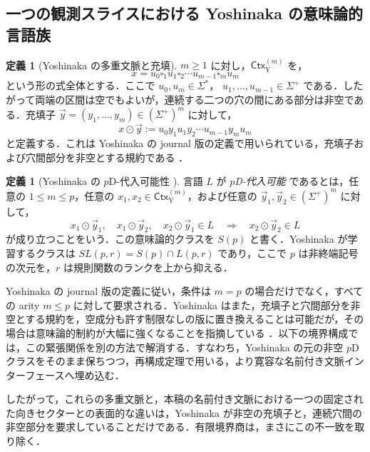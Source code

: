 \documentclass[11pt,a4paper]{ltjsarticle}
\numberwithin{equation}{section}
\theoremstyle{plain}
\theoremstyle{definition}
\newtheorem{definition}[theorem]{定義}
\theoremstyle{remark}
\newcommand{\tuple}[1]{\vec{#1}}
\newcommand{\blank}{\square}
\begin{document}
\subsection{一つの観測スライスにおける Yoshinaka の意味論的言語族}

\begin{definition}[Yoshinaka の多重文脈と充填]
\label{def:yoshinaka-multicontexts}
$m\ge1$ に対し，$\mathsf{Ctx}_{\mathrm Y}^{(m)}$ を，
\[
  x=u_0\blank_1u_1\blank_2\cdots
    u_{m-1}\blank_m u_m
\]
という形の式全体とする．ここで $u_0,u_m\in\Sigma^*$，
$u_1,\ldots,u_{m-1}\in\Sigma^+$ である．したがって両端の区間は空でもよいが，連続する二つの穴の間にある部分は非空である．充填子
$\tuple y=(y_1,\ldots,y_m)\in(\Sigma^+)^m$ に対して，
\[
  x\odot\tuple y
  :=u_0y_1u_1y_2\cdots u_{m-1}y_mu_m
\]
と定義する．これは Yoshinaka の journal 版の定義で用いられている，充填子および穴間部分を非空とする規約である \cite[Section~3.1, p.~1824]{Yoshinaka2011}．
\end{definition}

\begin{definition}[Yoshinaka の \(p\)D-代入可能性
{\cite[Section~3.1, p.~1824]{Yoshinaka2011}}]
\label{def:yoshinaka-pd-substitutability}
言語 \(L\) が \emph{\(p\)D-代入可能} であるとは，任意の
\(1\le m\le p\)，任意の \(x_1,x_2\in\mathsf{Ctx}_{\mathrm Y}^{(m)}\)，および任意の
\(\tuple y_1,\tuple y_2\in(\Sigma^+)^m\) に対して，
\[
 x_1\odot\tuple y_1,\quad x_1\odot\tuple y_2,\quad
 x_2\odot\tuple y_1\in L
 \quad\Longrightarrow\quad
 x_2\odot\tuple y_2\in L
\]
が成り立つことをいう．この意味論的クラスを \(S(p)\) と書く．Yoshinaka が学習するクラスは
\(SL(p,r)=S(p)\cap L(p,r)\) であり，ここで \(p\) は非終端記号の次元を，\(r\) は規則関数のランクを上から抑える．
\end{definition}

Yoshinaka の journal 版の定義に従い，条件は \(m=p\) の場合だけでなく，すべての arity \(m\le p\) に対して要求される．Yoshinaka はまた，充填子と穴間部分を非空とする規約を，空成分も許す制限なしの版に置き換えることは可能だが，その場合は意味論的制約が大幅に強くなることを指摘している \cite[footnote~3, p.~1824]{Yoshinaka2011}．以下の境界構成では，この緊張関係を別の方法で解消する．すなわち，Yoshinaka の元の非空 \(p\)D クラスをそのまま保ちつつ，再構成定理で用いる，より寛容な名前付き文脈インターフェースへ埋め込む．

したがって，これらの多重文脈と，本稿の名前付き文脈における一つの固定された向きセクターとの表面的な違いは，Yoshinaka が非空の充填子と，連続穴間の非空部分を要求していることだけである．有限境界商は，まさにこの不一致を取り除く．
\end{document}
